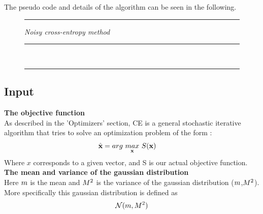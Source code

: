 The pseudo code and details of the algorithm can be seen in the following.

\begin{figure}[H]
\hrule
\vspace{0.2cm}
{\centering  \textit{Noisy cross-entropy method}}
\vspace{0.2cm}
\hrule
\begin{algorithmic}
\\

\Loop
{}
\EndLoop
\end{algorithmic}
\hrule
\end{figure}

\subsection{Input}

\textbf{The objective function} \\
As described in the 'Optimizers' section, CE is a general stochastic 
iterative algorithm that tries to solve an optimization problem of 
the form \citep{thiery:09}:
\begin{align*}
\hat{\textbf{\individual }} &= 
arg \  \underset{\textbf{\individual }}{max} \  
\fitnessFunction (\textbf{\individual }) \ 
\end{align*}
Where $x$ corresponds to a given vector, 
and S is our actual objective function. 
\\

\textbf{The mean and variance of the gaussian distribution} \\
Here $m$ is the mean and  $M^2$ is the variance 
of the gaussian distribution ($m$,$M^2$). 
More specifically this gaussian distribution is defined as 
\begin{align*}
\mathcal{N}(m,M^2)
\end{align*}

